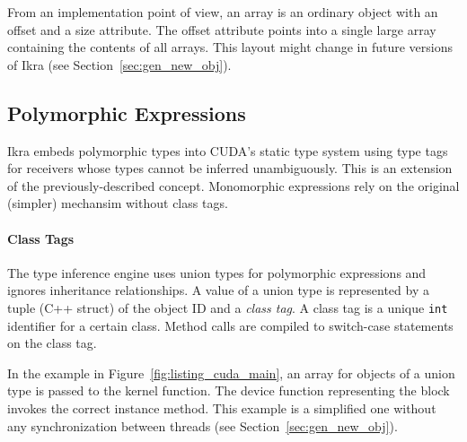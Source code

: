 \documentclass[preprint]{sigplanconf}
\begin{document}
From an implementation point of view, an array is an ordinary object with an offset and a size attribute. The offset attribute points into a single large array containing the contents of all arrays. This layout might change in future versions of Ikra (see Section~\ref{sec:gen_new_obj}).


\subsection{Polymorphic Expressions}
\label{sec:polymorphic}
Ikra embeds polymorphic types into CUDA's static type system using type tags~\cite{Abadi:1989:DTS:75277.75296} for receivers whose types cannot be inferred unambiguously. This is an extension of the previously-described concept. Monomorphic expressions rely on the original (simpler) mechansim without class tags.

\paragraph{Class Tags}
The type inference engine uses union types for polymorphic expressions and ignores inheritance relationships. A value of a union type is represented by a tuple (C++ struct) of the object ID and a \emph{class tag}. A class tag is a unique \texttt{int} identifier for a certain class. Method calls are compiled to switch-case statements on the class tag.

In the example in Figure~\ref{fig:listing_cuda_main}, an array for objects of a union type is passed to the kernel function. The device function representing the block invokes the correct instance method. This example is a simplified one without any synchronization between threads (see Section~\ref{sec:gen_new_obj}).
\end{document}
